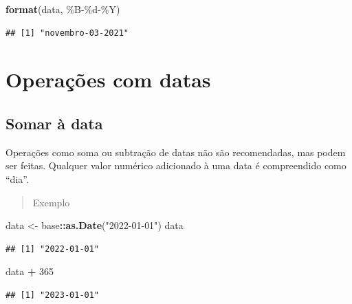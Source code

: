 \documentclass[
]{book}
\newenvironment{Shaded}{\begin{snugshade}}{\end{snugshade}}
\newcommand{\DecValTok}[1]{\textcolor[rgb]{0.00,0.00,0.81}{#1}}
\newcommand{\FunctionTok}[1]{\textcolor[rgb]{0.13,0.29,0.53}{\textbf{#1}}}
\newcommand{\NormalTok}[1]{#1}
\newcommand{\OtherTok}[1]{\textcolor[rgb]{0.56,0.35,0.01}{#1}}
\newcommand{\SpecialCharTok}[1]{\textcolor[rgb]{0.81,0.36,0.00}{\textbf{#1}}}
\newcommand{\StringTok}[1]{\textcolor[rgb]{0.31,0.60,0.02}{#1}}
\theoremstyle{definition}
\theoremstyle{definition}
\theoremstyle{definition}
\theoremstyle{definition}
\theoremstyle{remark}
\begin{document}
\begin{Shaded}
\begin{Highlighting}[]
\FunctionTok{format}\NormalTok{(data, }\StringTok{\textquotesingle{}\%B{-}\%d{-}\%Y\textquotesingle{}}\NormalTok{)}
\end{Highlighting}
\end{Shaded}

\begin{verbatim}
## [1] "novembro-03-2021"
\end{verbatim}

\hypertarget{operauxe7uxf5es-com-datas}{%
\section{Operações com datas}\label{operauxe7uxf5es-com-datas}}

\hypertarget{somar-uxe0-data}{%
\subsection{Somar à data}\label{somar-uxe0-data}}

Operações como soma ou subtração de datas não são recomendadas, mas podem ser feitas. Qualquer valor numérico adicionado à uma data é compreendido como ``dia''.

\begin{quote}
Exemplo
\end{quote}

\begin{Shaded}
\begin{Highlighting}[]
\NormalTok{data }\OtherTok{\textless{}{-}}\NormalTok{ base}\SpecialCharTok{::}\FunctionTok{as.Date}\NormalTok{(}\StringTok{"2022{-}01{-}01"}\NormalTok{)}
\NormalTok{data}
\end{Highlighting}
\end{Shaded}

\begin{verbatim}
## [1] "2022-01-01"
\end{verbatim}

\begin{Shaded}
\begin{Highlighting}[]
\NormalTok{data }\SpecialCharTok{+} \DecValTok{365}
\end{Highlighting}
\end{Shaded}

\begin{verbatim}
## [1] "2023-01-01"
\end{verbatim}
\end{document}
